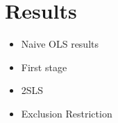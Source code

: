 \documentclass{beamer}
\begin{document}
%
%     
%
%    


\section{Results}
\begin{frame}
\begin{itemize}
\item Naive OLS results
\item First stage
\item 2SLS
\item Exclusion Restriction
\end{itemize}
\end{frame}

\begin{frame}{}
\scalebox{0.65}{}
\end{frame}

\begin{frame}{}
\scalebox{0.80}{}
\end{frame}


\begin{frame}{}
\scalebox{0.83}{}
\end{frame}
\end{document}
